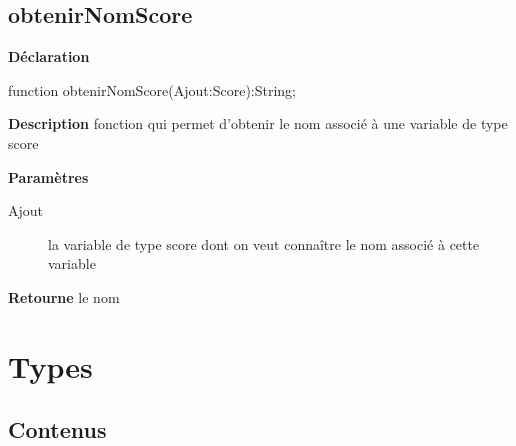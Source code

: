 \documentclass{report}
\newif\ifpdf
\begin{document}
\subsection*{obtenirNomScore}
\fi
\label{Types-obtenirNomScore}
\begin{list}{}{
\setlength{\itemindent}{0cm}
\setlength{\listparindent}{0cm}
\setlength{\leftmargin}{\evensidemargin}
\addtolength{\leftmargin}{\tmplength}
\settowidth{\labelsep}{X}
\addtolength{\leftmargin}{\labelsep}
\setlength{\labelwidth}{\tmplength}
}
\item[\textbf{Déclaration}\hfill]
\ifpdf
\begin{flushleft}
\fi
\begin{ttfamily}
function obtenirNomScore(Ajout:Score):String;\end{ttfamily}

\ifpdf
\end{flushleft}
\fi

\par
\item[\textbf{Description}]
fonction qui permet d'obtenir le nom associé à une variable de type score  \par
\item[\textbf{Paramètres}]
\begin{description}
\item[Ajout] la variable de type score dont on veut connaître le nom associé à cette variable
\end{description}
\item[\textbf{Retourne}]le nom


\end{list}
\section{Types}
\ifpdf
\subsection*{\large{\textbf{Contenus}}\normalsize\hspace{1ex}\hrulefill}
\else
\end{document}
